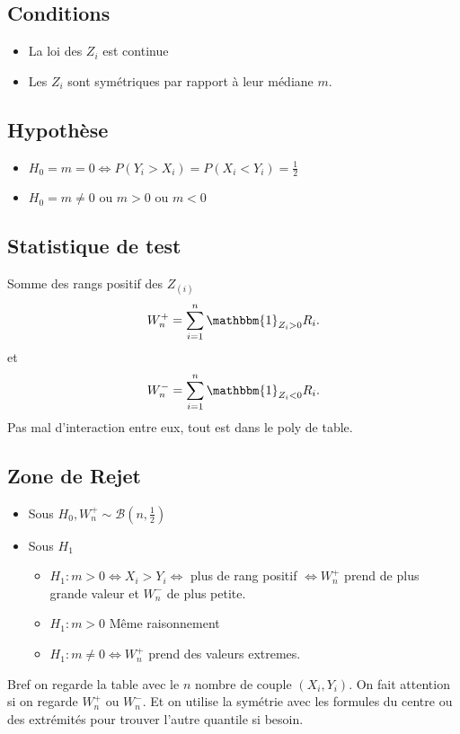 \documentclass{article}
\theoremstyle{plain}%
\theoremstyle{definition}
\theoremstyle{remark}
\begin{document}
\subsection*{Conditions}
\begin{itemize}
    \item La loi des $ Z_i $ est continue
    \item Les $ Z_i $ sont symétriques par rapport à leur médiane $ m $.
\end{itemize}

\subsection*{Hypothèse}
\begin{itemize}
    \item $ H_0 = m = 0 \Leftrightarrow P(Y_i > X_i) = P(X_i < Y_i) = \frac{1}{2}$ 
    \item $ H_0 = m \neq 0 $ ou $ m > 0 $ ou $ m < 0 $ 
\end{itemize}

\subsection*{Statistique de test}
Somme des rangs positif des $ Z_{(i)} $
\[
    W_n^+ = \sum_{i=1}^{n}\mathbbm{1}_{Z_i > 0}R_i
.\]
et 
\[
    W_n^- = \sum_{i=1}^{n}\mathbbm{1}_{Z_i < 0}R_i
.\]
Pas mal d'interaction entre eux, tout est dans le poly de table.

\subsection*{Zone de Rejet}
\begin{itemize}
    \item Sous $ H_0, W_n^+ \sim \mathcal{B}(n, \frac{1}{2}) $ 
    \item Sous $ H_1 $ \begin{itemize}
        \item $ H_1 : m > 0 \Leftrightarrow X_i > Y_i \Leftrightarrow $ plus de rang positif $ \Leftrightarrow W_n^+ $ prend de plus grande valeur et $ W_n^- $ de plus petite.
        \item $ H_1 : m > 0 $ Même raisonnement
        \item $ H_1 : m \neq 0 \Leftrightarrow W_n^+ $ prend des valeurs extremes.
    \end{itemize}
\end{itemize}
Bref on regarde la table avec le $ n $ nombre de couple $ (X_i, Y_i) $. On fait attention si on regarde $ W_n^+ $ ou $ W_n^- $. Et on utilise la symétrie avec les formules du centre ou des extrémités pour trouver l'autre quantile si besoin.
\end{document}
